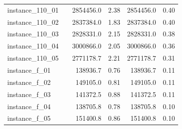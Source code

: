 \documentclass[12pt,a4paper,openright,twoside]{book}
\begin{document}
\begin{table}[H]
\begin{tabular}{|ll|rr|rr|}
 instance\_110\_01                  &     &   2854456.0 &     2.38 &  2854456.0 &     0.40  \\ 
 instance\_110\_02                  &     &   2837384.0 &     1.83 &  2837384.0 &     0.40  \\ 
 instance\_110\_03                  &     &   2828331.0 &     2.15 &  2828331.0 &     0.38  \\ 
 instance\_110\_04                  &     &   3000866.0 &     2.05 &  3000866.0 &     0.36  \\ 
 instance\_110\_05                  &     &   2771178.7 &     2.21 &  2771178.7 &     0.31  \\ 
 instance\_f\_01                    &     &    138936.7 &     0.76 &   138936.7 &     0.11  \\ 
 instance\_f\_02                    &     &    149105.0 &     0.81 &   149105.0 &     0.11  \\ 
 instance\_f\_03                    &     &    141372.5 &     0.88 &   141372.5 &     0.11  \\ 
 instance\_f\_04                    &     &    138705.8 &     0.78 &   138705.8 &     0.10  \\ 
 instance\_f\_05                    &     &    151400.8 &     0.86 &   151400.8 &     0.10  \\ 
  \hline
\end{tabular}

\end{table}
\end{document}
